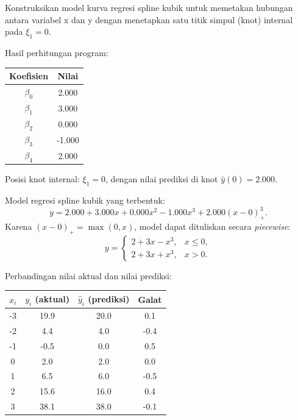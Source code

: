 \documentclass[12pt,a4paper]{report}
\begin{document}
Konstruksikan model kurva regresi spline kubik untuk memetakan hubungan antara variabel x dan
y dengan menetapkan satu titik simpul (knot) internal pada $\xi_1 = 0$.



Hasil perhitungan program:

\begin{center}
\begin{tabular}{|c|c|}
\hline
Koefisien & Nilai \\
\hline
$\beta_0$ & 2.000 \\
$\beta_1$ & 3.000 \\
$\beta_2$ & 0.000 \\
$\beta_3$ & -1.000 \\
$\beta_4$ & 2.000 \\
\hline
\end{tabular}
\end{center}

Posisi knot internal: $\xi_1 = 0$, dengan nilai prediksi di knot
$\hat{y}(0) = 2.000$.

Model regresi spline kubik yang terbentuk:
\[
y = 2.000 + 3.000x + 0.000x^2 - 1.000x^3 + 2.000(x-0)_+^3.
\]
Karena $(x-0)_+ = \max(0,x)$, model dapat dituliskan secara \emph{piecewise}:
\[
y =
\begin{cases}
2 + 3x - x^3, & x \le 0,\\[4pt]
2 + 3x + x^3, & x > 0.
\end{cases}
\]

Perbandingan nilai aktual dan nilai prediksi:

\begin{center}
\begin{tabular}{|c|c|c|c|}
\hline
$x_i$ & $y_i$ (aktual) & $\hat{y}_i$ (prediksi) & Galat \\
\hline
-3 & 19.9 & 20.0 & 0.1 \\
-2 &  4.4 &  4.0 & -0.4 \\
-1 & -0.5 &  0.0 & 0.5 \\
 0 &  2.0 &  2.0 & 0.0 \\
 1 &  6.5 &  6.0 & -0.5 \\
 2 & 15.6 & 16.0 & 0.4 \\
 3 & 38.1 & 38.0 & -0.1 \\
\hline
\end{tabular}
\end{center}
\end{document}
